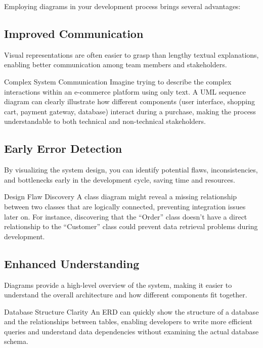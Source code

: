 Employing diagrams in your development process brings several advantages:

\subsection{Improved Communication}

Visual representations are often easier to grasp than lengthy textual explanations, enabling better communication among team members and stakeholders.

\begin{examplecard}{Complex System Communication}
  Imagine trying to describe the complex interactions within an e-commerce platform using only text. A UML sequence diagram can clearly illustrate how different components (user interface, shopping cart, payment gateway, database) interact during a purchase, making the process understandable to both technical and non-technical stakeholders.
\end{examplecard}

\subsection{Early Error Detection}

By visualizing the system design, you can identify potential flaws, inconsistencies, and bottlenecks early in the development cycle, saving time and resources.

\begin{examplecard}{Design Flaw Discovery}
  A class diagram might reveal a missing relationship between two classes that are logically connected, preventing integration issues later on. For instance, discovering that the ``Order'' class doesn't have a direct relationship to the ``Customer'' class could prevent data retrieval problems during development.
\end{examplecard}

\subsection{Enhanced Understanding}

Diagrams provide a high-level overview of the system, making it easier to understand the overall architecture and how different components fit together.

\begin{examplecard}{Database Structure Clarity}
  An ERD can quickly show the structure of a database and the relationships between tables, enabling developers to write more efficient queries and understand data dependencies without examining the actual database schema.
\end{examplecard}

